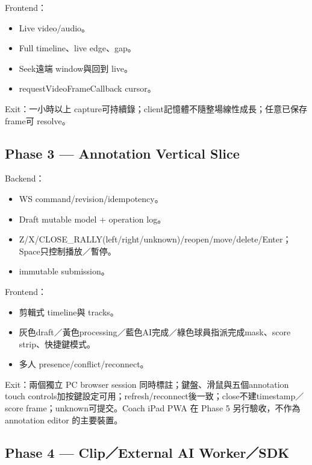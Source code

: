 \documentclass[
  9pt,
  a4paper,
]{article}
\providecommand{\tightlist}{%
  \setlength{\itemsep}{0pt}\setlength{\parskip}{0pt}}
\begin{document}
Frontend：

\begin{itemize}
\tightlist
\item
  Live video/audio。
\item
  Full timeline、live edge、gap。
\item
  Seek遠端 window與回到 live。
\item
  requestVideoFrameCallback cursor。
\end{itemize}

Exit：一小時以上
capture可持續錄；client記憶體不隨整場線性成長；任意已保存 frame可
resolve。

\subsection{Phase 3 --- Annotation Vertical
Slice}\label{phase-3--annotation-vertical-slice}

Backend：

\begin{itemize}
\tightlist
\item
  WS command/revision/idempotency。
\item
  Draft mutable model + operation log。
\item
  Z/X/CLOSE\_RALLY(left/right/unknown)/reopen/move/delete/Enter；Space只控制播放／暫停。
\item
  immutable submission。
\end{itemize}

Frontend：

\begin{itemize}
\tightlist
\item
  剪輯式 timeline與 tracks。
\item
  灰色draft／黃色processing／藍色AI完成／綠色球員指派完成mask、score strip、快捷鍵模式。
\item
  多人 presence/conflict/reconnect。
\end{itemize}

Exit：兩個獨立 PC browser session 同時標註；鍵盤、滑鼠與五個annotation touch controls加按鍵設定可用；refresh/reconnect後一致；close不建timestamp／score
frame；unknown可提交。Coach iPad PWA 在 Phase 5 另行驗收，不作為 annotation editor 的主要裝置。

\subsection{Phase 4 --- Clip／External AI
Worker／SDK}\label{phase-4--clipexternal-ai-workersdk}
\end{document}
